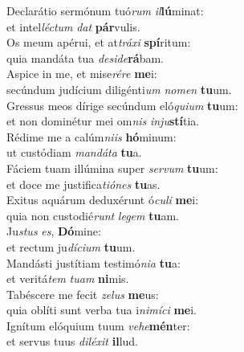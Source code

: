 \evenverse Declarátio sermónum tuó\textit{rum} \textit{il}\textbf{lú}minat:~\*\\
\evenverse et intel\textit{lé}\textit{ctum} \textit{dat} \textbf{pár}vulis.\\
\oddverse Os meum apérui, et at\textit{trá}\textit{xi} \textbf{spí}ritum:~\*\\
\oddverse quia mandáta tua \textit{de}\textit{si}\textit{de}\textbf{rá}bam.\\
\evenverse Aspice in me, et mise\textit{ré}\textit{re} \textbf{me}i:~\*\\
\evenverse secúndum judícium diligénti\textit{um} \textit{no}\textit{men} \textbf{tu}um.\\
\oddverse Gressus meos dírige secúndum eló\textit{qui}\textit{um} \textbf{tu}um:~\*\\
\oddverse et non dominétur mei om\textit{nis} \textit{in}\textit{ju}\textbf{stí}tia.\\
\evenverse Rédime me a calúm\textit{ni}\textit{is} \textbf{hó}minum:~\*\\
\evenverse ut custódiam \textit{man}\textit{dá}\textit{ta} \textbf{tu}a.\\
\oddverse Fáciem tuam illúmina super \textit{ser}\textit{vum} \textbf{tu}um:~\*\\
\oddverse et doce me justifica\textit{ti}\textit{ó}\textit{nes} \textbf{tu}as.\\
\evenverse Exitus aquárum deduxérunt ó\textit{cu}\textit{li} \textbf{me}i:~\*\\
\evenverse quia non custodié\textit{runt} \textit{le}\textit{gem} \textbf{tu}am.\\
\oddverse Ju\textit{stus} \textit{es}, \textbf{Dó}mine:~\*\\
\oddverse et rectum ju\textit{dí}\textit{ci}\textit{um} \textbf{tu}um.\\
\evenverse Mandásti justítiam testimó\textit{ni}\textit{a} \textbf{tu}a:~\*\\
\evenverse et veritá\textit{tem} \textit{tu}\textit{am} \textbf{ni}mis.\\
\oddverse Tabéscere me fecit \textit{ze}\textit{lus} \textbf{me}us:~\*\\
\oddverse quia oblíti sunt verba tua i\textit{ni}\textit{mí}\textit{ci} \textbf{me}i.\\
\evenverse Ignítum elóquium tuum \textit{ve}\textit{he}\textbf{mén}ter:~\*\\
\evenverse et servus tuus \textit{di}\textit{lé}\textit{xit} \textbf{il}lud.\\
